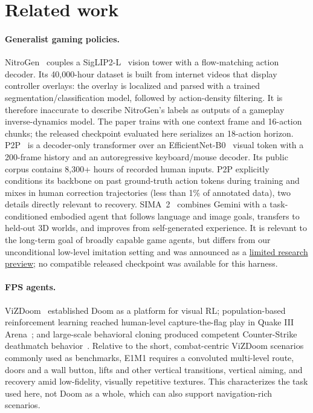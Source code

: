 \documentclass[11pt]{article}
\begin{document}
\section{Related work}\label{sec:related}

\paragraph{Generalist gaming policies.} NitroGen~\cite{nitrogen} couples a SigLIP2-L~\cite{siglip2} vision tower with a flow-matching action decoder. Its 40{,}000-hour dataset is built from internet videos that display controller overlays: the overlay is localized and parsed with a trained segmentation/classification model, followed by action-density filtering. It is therefore inaccurate to describe NitroGen's labels as outputs of a gameplay inverse-dynamics model. The paper trains with one context frame and 16-action chunks; the released checkpoint evaluated here serializes an 18-action horizon. P2P~\cite{p2p} is a decoder-only transformer over an EfficientNet-B0~\cite{efficientnet} visual token with a 200-frame history and an autoregressive keyboard/mouse decoder. Its public corpus contains 8{,}300+ hours of recorded human inputs. P2P explicitly conditions its backbone on past ground-truth action tokens during training and mixes in human correction trajectories (less than 1\% of annotated data), two details directly relevant to recovery. SIMA~2~\cite{sima2} combines Gemini with a task-conditioned embodied agent that follows language and image goals, transfers to held-out 3D worlds, and improves from self-generated experience. It is relevant to the long-term goal of broadly capable game agents, but differs from our unconditional low-level imitation setting and was announced as a \href{https://deepmind.google/blog/sima-2-an-agent-that-plays-reasons-and-learns-with-you-in-virtual-3d-worlds/}{limited research preview}; no compatible released checkpoint was available for this harness.

\paragraph{FPS agents.} ViZDoom~\cite{vizdoom} established Doom as a platform for visual RL; population-based reinforcement learning reached human-level capture-the-flag play in Quake III Arena~\cite{ftw}; and large-scale behavioral cloning produced competent Counter-Strike deathmatch behavior~\cite{csgo}. Relative to the short, combat-centric ViZDoom scenarios commonly used as benchmarks, E1M1 requires a convoluted multi-level route, doors and a wall button, lifts and other vertical transitions, vertical aiming, and recovery amid low-fidelity, visually repetitive textures. This characterizes the task used here, not Doom as a whole, which can also support navigation-rich scenarios.
\end{document}
